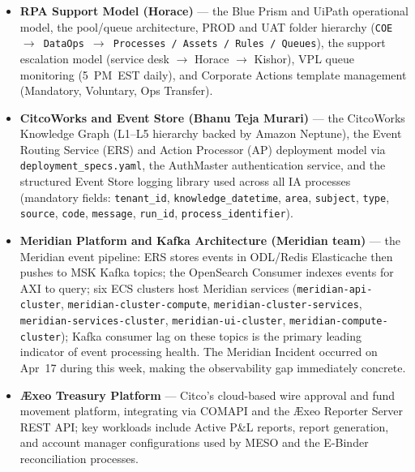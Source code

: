 \begin{itemize}
    \item \textbf{RPA Support Model (Horace)} --- the Blue Prism and UiPath
          operational model, the pool/queue architecture, PROD and UAT folder
          hierarchy (\texttt{COE $\to$ DataOps $\to$ Processes / Assets / Rules /
          Queues}), the support escalation model (service desk $\to$ Horace $\to$
          Kishor), VPL queue monitoring (5~PM~EST daily), and Corporate Actions
          template management (Mandatory, Voluntary, Ops Transfer).

    \item \textbf{CitcoWorks and Event Store (Bhanu Teja Murari)} --- the
          CitcoWorks Knowledge Graph (L1--L5 hierarchy backed by Amazon Neptune),
          the Event Routing Service (ERS) and Action Processor (AP) deployment
          model via \texttt{deployment\_specs.yaml}, the AuthMaster authentication
          service, and the structured Event Store logging library used across all
          IA processes (mandatory fields: \texttt{tenant\_id},
          \texttt{knowledge\_datetime}, \texttt{area}, \texttt{subject},
          \texttt{type}, \texttt{source}, \texttt{code}, \texttt{message},
          \texttt{run\_id}, \texttt{process\_identifier}).

    \item \textbf{Meridian Platform and Kafka Architecture (Meridian team)} ---
          the Meridian event pipeline: ERS stores events in ODL/Redis Elasticache
          then pushes to MSK Kafka topics; the OpenSearch Consumer indexes events
          for AXI to query; six ECS clusters host Meridian services
          (\texttt{meridian-api-cluster}, \texttt{meridian-cluster-compute},
          \texttt{meridian-cluster-services}, \texttt{meridian-services-cluster},
          \texttt{meridian-ui-cluster}, \texttt{meridian-compute-cluster}); Kafka
          consumer lag on these topics is the primary leading indicator of event
          processing health. The Meridian Incident occurred on Apr~17 during
          this week, making the observability gap immediately concrete.

    \item \textbf{\AE xeo Treasury Platform} --- Citco's cloud-based wire
          approval and fund movement platform, integrating via COMAPI and the
          \AE xeo Reporter Server REST API; key workloads include Active P\&L
          reports, report generation, and account manager configurations used by
          MESO and the E-Binder reconciliation processes.
\end{itemize}

